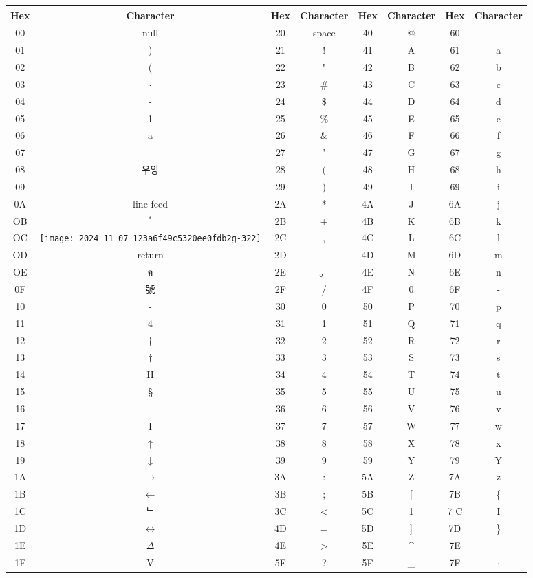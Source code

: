 \documentclass[10pt]{article}
\begin{document}
\begin{center}
\begin{tabular}{|c|c|c|c|c|c|c|c|}
\hline
Hex & Character & Hex & Character & Hex & Character & Hex & Character \\
\hline
00 & null & 20 & space & 40 & @ & 60 &  \\
\hline
01 & ) & 21 & ! & 41 & A & 61 & a \\
\hline
02 & ( & 22 & " & 42 & B & 62 & b \\
\hline
03 & $\cdot$ & 23 & \# & 43 & C & 63 & c \\
\hline
04 & - & 24 & \$ & 44 & D & 64 & d \\
\hline
05 & 1 & 25 & \% & 45 & E & 65 & e \\
\hline
06 & a & 26 & \& & 46 & F & 66 & f \\
\hline
07 &  & 27 & ' & 47 & G & 67 & g \\
\hline
08 & 우앙 & 28 & $($ & 48 & H & 68 & h \\
\hline
09 &  & 29 & ) & 49 & I & 69 & i \\
\hline
0A & line feed & 2A & * & 4A & J & 6A & j \\
\hline
OB & ${ }^{*}$ & 2B & + & 4B & K & 6B & k \\
\hline
OC & \texttt{[image: 2024\_11\_07\_123a6f49c5320ee0fdb2g-322]}
 & 2C & , & 4C & L & 6C & l \\
\hline
OD & return & 2D & - & 4D & M & 6D & m \\
\hline
OE & ค & 2E & 。 & 4E & N & 6E & n \\
\hline
0F & 號 & 2F & / & 4F & 0 & 6F & - \\
\hline
10 & - & 30 & 0 & 50 & P & 70 & p \\
\hline
11 & 4 & 31 & 1 & 51 & Q & 71 & q \\
\hline
12 & † & 32 & 2 & 52 & R & 72 & r \\
\hline
13 & $\dagger$ & 33 & 3 & 53 & S & 73 & s \\
\hline
14 & II & 34 & 4 & 54 & T & 74 & t \\
\hline
15 & § & 35 & 5 & 55 & U & 75 & u \\
\hline
16 & - & 36 & 6 & 56 & V & 76 & v \\
\hline
17 & I & 37 & 7 & 57 & W & 77 & w \\
\hline
18 & $\uparrow$ & 38 & 8 & 58 & X & 78 & x \\
\hline
19 & $\downarrow$ & 39 & 9 & 59 & Y & 79 & Y \\
\hline
1A & $\rightarrow$ & 3A & : & 5A & Z & 7A & z \\
\hline
1B & $\leftarrow$ & 3B & ; & 5B & [ & 7B & \{ \\
\hline
1C & ᄂ & 3C & < & 5C & 1 & 7 C & I \\
\hline
1D & $\leftrightarrow$ & 4D & = & 5D & ] & 7D & \} \\
\hline
1E & $\Delta$ & 4E & $>$ & 5E & \^{} & 7E &  \\
\hline
1F & V & 5F & ? & 5F & \_ & 7F & $\cdot$ \\
\hline
\end{tabular}
\end{center}
\end{document}
